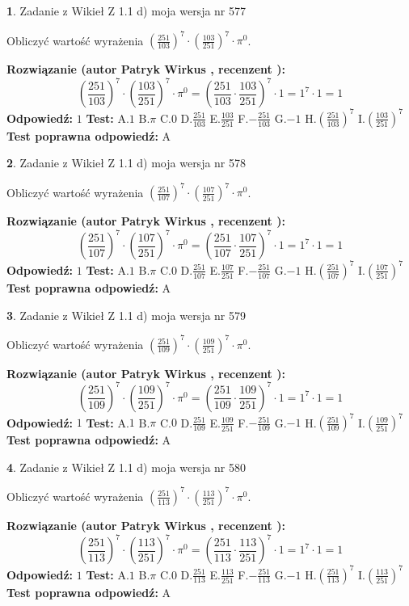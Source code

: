 \documentclass[12pt, a4paper]{article}
\theoremstyle{definition} %
\newtheorem{zad}{}
\newcommand{\zadStart}[1]{\begin{zad}#1\newline}
\newcommand{\zadStop}{\end{zad}}
\newcommand{\rozwStart}[2]{\noindent \textbf{Rozwiązanie (autor #1 , recenzent #2): }\newline}
\newcommand{\rozwStop}{\newline}
\newcommand{\odpStart}{\noindent \textbf{Odpowiedź:}\newline}
\newcommand{\odpStop}{\newline}
\newcommand{\testStart}{\noindent \textbf{Test:}\newline}
\newcommand{\testStop}{\newline}
\newcommand{\kluczStart}{\noindent \textbf{Test poprawna odpowiedź:}\newline}
\newcommand{\kluczStop}{\newline}
\begin{document}
\zadStart{Zadanie z Wikieł Z 1.1 d) moja wersja nr 577}

Obliczyć wartość wyrażenia $(\frac{251}{103})^{7} \cdot (\frac{103}{251})^{7} \cdot \pi^{0}$.
\zadStop
\rozwStart{Patryk Wirkus}{}
$$(\frac{251}{103})^{7} \cdot (\frac{103}{251})^{7} \cdot \pi^{0} = (\frac{251}{103} \cdot \frac{103}{251})^{7} \cdot 1 = 1^{7} \cdot 1 = 1$$
\rozwStop
\odpStart
$1$
\odpStop
\testStart
A.$1$ B.$\pi$ C.$0$ D.$\frac{251}{103}$ E.$\frac{103}{251}$
F.$-\frac{251}{103}$ G.$-1$
H.$(\frac{251}{103})^{7}$
I.$(\frac{103}{251})^{7}$
\testStop
\kluczStart
A
\kluczStop



\zadStart{Zadanie z Wikieł Z 1.1 d) moja wersja nr 578}

Obliczyć wartość wyrażenia $(\frac{251}{107})^{7} \cdot (\frac{107}{251})^{7} \cdot \pi^{0}$.
\zadStop
\rozwStart{Patryk Wirkus}{}
$$(\frac{251}{107})^{7} \cdot (\frac{107}{251})^{7} \cdot \pi^{0} = (\frac{251}{107} \cdot \frac{107}{251})^{7} \cdot 1 = 1^{7} \cdot 1 = 1$$
\rozwStop
\odpStart
$1$
\odpStop
\testStart
A.$1$ B.$\pi$ C.$0$ D.$\frac{251}{107}$ E.$\frac{107}{251}$
F.$-\frac{251}{107}$ G.$-1$
H.$(\frac{251}{107})^{7}$
I.$(\frac{107}{251})^{7}$
\testStop
\kluczStart
A
\kluczStop



\zadStart{Zadanie z Wikieł Z 1.1 d) moja wersja nr 579}

Obliczyć wartość wyrażenia $(\frac{251}{109})^{7} \cdot (\frac{109}{251})^{7} \cdot \pi^{0}$.
\zadStop
\rozwStart{Patryk Wirkus}{}
$$(\frac{251}{109})^{7} \cdot (\frac{109}{251})^{7} \cdot \pi^{0} = (\frac{251}{109} \cdot \frac{109}{251})^{7} \cdot 1 = 1^{7} \cdot 1 = 1$$
\rozwStop
\odpStart
$1$
\odpStop
\testStart
A.$1$ B.$\pi$ C.$0$ D.$\frac{251}{109}$ E.$\frac{109}{251}$
F.$-\frac{251}{109}$ G.$-1$
H.$(\frac{251}{109})^{7}$
I.$(\frac{109}{251})^{7}$
\testStop
\kluczStart
A
\kluczStop



\zadStart{Zadanie z Wikieł Z 1.1 d) moja wersja nr 580}

Obliczyć wartość wyrażenia $(\frac{251}{113})^{7} \cdot (\frac{113}{251})^{7} \cdot \pi^{0}$.
\zadStop
\rozwStart{Patryk Wirkus}{}
$$(\frac{251}{113})^{7} \cdot (\frac{113}{251})^{7} \cdot \pi^{0} = (\frac{251}{113} \cdot \frac{113}{251})^{7} \cdot 1 = 1^{7} \cdot 1 = 1$$
\rozwStop
\odpStart
$1$
\odpStop
\testStart
A.$1$ B.$\pi$ C.$0$ D.$\frac{251}{113}$ E.$\frac{113}{251}$
F.$-\frac{251}{113}$ G.$-1$
H.$(\frac{251}{113})^{7}$
I.$(\frac{113}{251})^{7}$
\testStop
\kluczStart
A
\kluczStop
\end{document}
